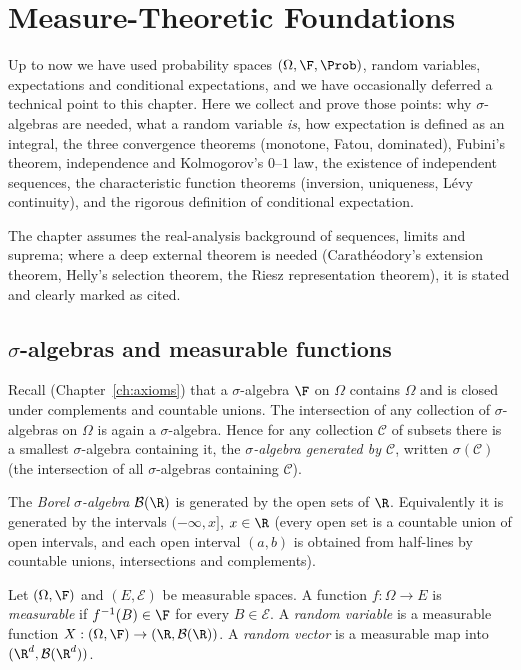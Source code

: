 \chapter{Measure-Theoretic Foundations}
\label{ch:measure}

Up to now we have used probability spaces $(\Omega,\F,\Prob)$, random variables,
expectations and conditional expectations, and we have occasionally deferred a
technical point to this chapter. Here we collect and prove those points: why
$\sigma$-algebras are needed, what a random variable \emph{is}, how expectation is
defined as an integral, the three convergence theorems (monotone, Fatou, dominated),
Fubini's theorem, independence and Kolmogorov's $0$--$1$ law, the existence of independent
sequences, the characteristic function theorems (inversion, uniqueness, L\'evy continuity),
and the rigorous definition of conditional expectation.

The chapter assumes the real-analysis background of sequences, limits and suprema; where
a deep external theorem is needed (Carath\'eodory's extension theorem, Helly's selection
theorem, the Riesz representation theorem), it is stated and clearly marked as cited.

\section{$\sigma$-algebras and measurable functions}

Recall (Chapter~\ref{ch:axioms}) that a $\sigma$-algebra $\F$ on $\Omega$ contains
$\Omega$ and is closed under complements and countable unions. The intersection of any
collection of $\sigma$-algebras on $\Omega$ is again a $\sigma$-algebra. Hence for any
collection $\mathcal C$ of subsets there is a smallest $\sigma$-algebra containing it, the
\emph{$\sigma$-algebra generated by $\mathcal C$}, written $\sigma(\mathcal C)$ (the
intersection of all $\sigma$-algebras containing $\mathcal C$).

\begin{definition}
The \emph{Borel $\sigma$-algebra} $\mathcal B(\R)$ is generated by the open sets of $\R$.
Equivalently it is generated by the intervals $(-\infty,x]$, $x\in\R$ (every open set is a
countable union of open intervals, and each open interval $(a,b)$ is obtained from
half-lines by countable unions, intersections and complements).
\end{definition}

\begin{definition}
Let $(\Omega,\F)$ and $(E,\mathcal E)$ be measurable spaces. A function $f:\Omega\to E$ is
\emph{measurable} if $f^{-1}(B)\in\F$ for every $B\in\mathcal E$. A \emph{random variable} is
a measurable function $X:(\Omega,\F)\to(\R,\mathcal B(\R))$. A \emph{random vector} is a
measurable map into $(\R^d,\mathcal B(\R^d))$.
\end{definition}

